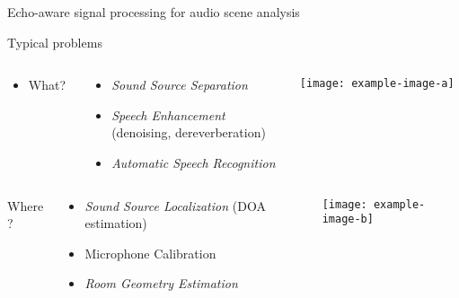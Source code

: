\begin{frame}[t]{Echo-aware signal processing for \alert{audio scene analysis}}

    Typical problems
    \begin{columns}[t,onlytextwidth]
        \begin{column}[T]{0.2\textwidth}
            \begin{itemize}
                \item What?
            \end{itemize}
        \end{column}
        \begin{column}[T]{0.5\textwidth}
            \begin{itemize}
                \item \alert{\textit{Sound Source Separation}}
                \item \alert{\textit{Speech Enhancement}}
                \\(denoising, dereverberation)
                \item \textit{Automatic Speech Recognition}
            \end{itemize}
        \end{column}
        \begin{column}[T]{0.24\textwidth}
            \texttt{[image: example-image-a]}
        \end{column}
    \end{columns}

    \begin{columns}[t]
        \begin{column}{0.2\textwidth}
            Where?
        \end{column}
        \begin{column}{0.5\textwidth}
            \begin{itemize}
                \item \alert{\textit{Sound Source Localization}} (DOA estimation)
                \item Microphone Calibration
                \item \alert{\textit{Room Geometry Estimation}}
            \end{itemize}
        \end{column}
        \begin{column}{0.24\textwidth}
            \texttt{[image: example-image-b]}
        \end{column}
    \end{columns}


\end{frame}
